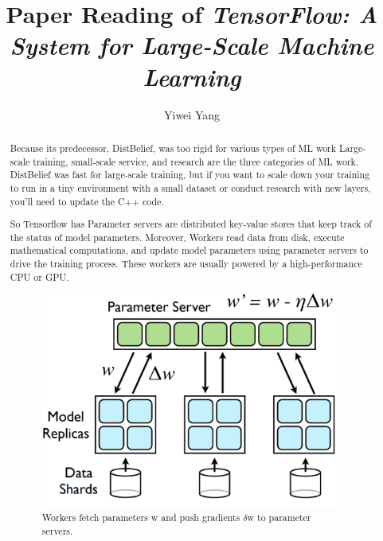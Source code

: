 \documentclass[acmlarge]{acmart}
\begin{document}
\title{Paper Reading of \textit{TensorFlow: A System for Large-Scale Machine Learning}}

\author{Yiwei Yang}

\renewcommand{\shortauthors}{Yiwei Yang}

\begin{abstract}
Because its predecessor, DistBelief, was too rigid for various types of ML work Large-scale training, small-scale service, and research are the three categories of ML work. DistBelief was fast for large-scale training, but if you want to scale down your training to run in a tiny environment with a small dataset or conduct research with new layers, you'll need to update the C++ code.

So Tensorflow \cite{abadi2016tensorflow} has Parameter servers are distributed key-value stores that keep track of the status of model parameters. Moreover, Workers read data from disk, execute mathematical computations, and update model parameters using parameter servers to drive the training process. These workers are usually powered by a high-performance CPU or GPU.
\begin{figure}[htbp]
  \centering
  \includegraphics[width=10cm]{./workers.png}
  \caption{Workers fetch parameters w and push gradients $\delta$w to parameter servers.}
\end{figure}
\end{abstract}
\end{document}
